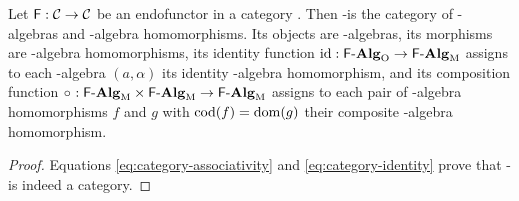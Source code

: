 \begin{definition}%
  \label{def:category-alg}


  Let $\mathsf{F}: \mathcal{C} \to \mathcal{C}$ be an endofunctor in a category
  . Then -\alg is the category of -algebras and
  -algebra homomorphisms. Its objects are -algebras,
  its morphisms are -algebra homomorphisms, its identity
  function $\operatorname{id}: \mathcal{\mathsf{F}\text{-}\mathbf{Alg}}_{\operatorname{O}} \to \mathcal{\mathsf{F}\text{-}\mathbf{Alg}}_{\operatorname{M}}$ assigns to each
  -algebra $(a, \alpha)$ its identity -algebra
  homomorphism, and its composition function $\mathrel{\circ}\ : \mathcal{\mathsf{F}\text{-}\mathbf{Alg}}_{\operatorname{M}}
  \times \mathcal{\mathsf{F}\text{-}\mathbf{Alg}}_{\operatorname{M}} \to \mathcal{\mathsf{F}\text{-}\mathbf{Alg}}_{\operatorname{M}}$ assigns to each pair of
  -algebra homomorphisms $f$ and $g$ with $\operatorname{cod}(f) = \operatorname{dom}(g)$
  their composite -algebra homomorphism.

  \begin{proof}

    Equations \eqref{eq:category-associativity} and
    \eqref{eq:category-identity} prove that -\alg is indeed a
    category.

  \end{proof}

\end{definition}


